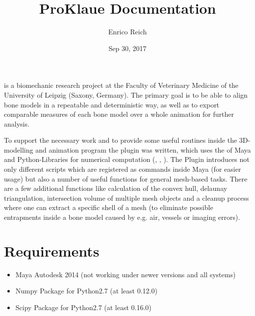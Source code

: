 \documentclass[letterpaper,10pt,english]{sphinxmanual}
\title{ProKlaue Documentation}
\date{Sep 30, 2017}
\author{Enrico Reich}
\begin{document}
\maketitle
\sphinxtableofcontents
{}\label{\detokenize{index::doc}}

\label{\detokenize{index:module-proKlaue}}
 is a biomechanic research project at the Faculty of Veterinary Medicine of the University of Leipzig (Saxony, Germany). The primary goal is to be able to align bone models in a repeatable and deterministic way, as well as to export comparable measures of each bone model over a whole animation for further analysis.

To support the necessary work and to provide some useful routines inside the 3D-modelling and animation program  the plugin  was written, which uses the  of Maya and Python-Libraries for numerical computation (, , ). The Plugin introduces not only different scripts which are registered as commands inside Maya (for easier usage) but also a number of useful functions for general mesh-based tasks. There are a few additional functions like calculation of the convex hull, delaunay triangulation, intersection volume of multiple mesh objects and a cleanup process where one can extract a specific shell of a mesh (to eliminate possible entrapments inside a bone model caused by e.g. air, vessels or imaging errors).


\chapter{Requirements}
\label{\detokenize{index:welcome-to-proklaue-s-documentation}}\label{\detokenize{index:main}}\label{\detokenize{index:requirements}}\label{\detokenize{index:module-proKlaue}}\begin{itemize}
\item {} 
Maya Autodesk 2014 (not working under newer versions and all systems)

\item {} 
Numpy Package for Python2.7 (at least 0.12.0)

\item {} 
Scipy Package for Python2.7 (at least 0.16.0)

\end{itemize}
\end{document}
